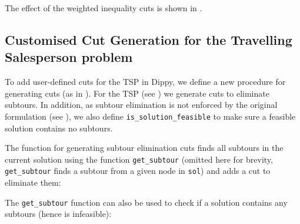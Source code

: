 The effect of the weighted inequality cuts is shown in .

\subsection{Customised Cut Generation for the Travelling Salesperson problem}

To add user-defined cuts for the \ac{TSP} in Dippy, we define a new procedure for generating cuts (as in ). For the \ac{TSP} (see ) we generate cuts to eliminate subtours. In addition, as subtour elimination is not enforced by the original formulation (see ), we also define \texttt{is\_solution\_feasible} to make sure a feasible solution contains no subtours.

The function for generating subtour elimination cuts finds all subtours in the current solution using the function \texttt{get\_subtour} (omitted here for brevity, \\ \texttt{get\_subtour} finds a subtour from a given node in \texttt{sol}) and adds a cut to eliminate them:


The \texttt{get\_subtour} function can also be used to check if a solution contains any subtours (hence is infeasible):


